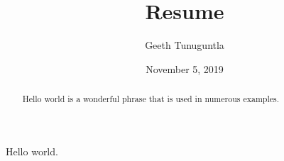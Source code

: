 \documentclass{article} %
\author{Geeth Tunuguntla}
\title{Resume}
\date{November 5, 2019}
\begin{document}
\maketitle %
\newpage%
\begin{abstract}
Hello world is a wonderful phrase that is used in numerous examples.
\end{abstract}

Hello world.
\end{document}
